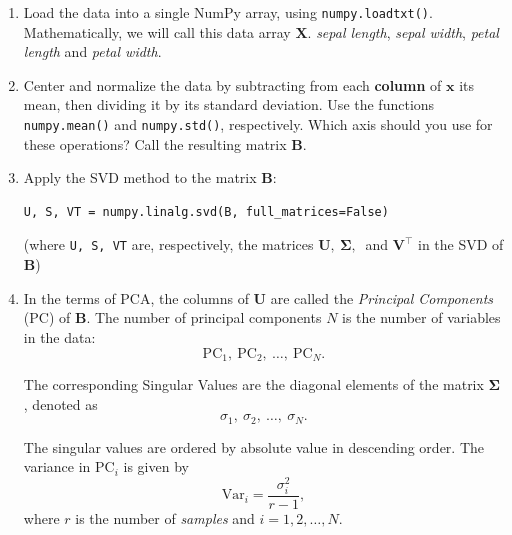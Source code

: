 \documentclass[12pt]{scrartcl}
\newcommand{\pyinl}[1]{\texttt{#1}}
\newcommand{\mtrx}[1]{\mathbf{#1}}
\newcommand{\T}[1]{#1^{\intercal}}
\newcommand{\PC}[1]{\mathrm{PC}_{#1}}
\newcommand{\var}[1]{\mathrm{Var}_{#1}}
\begin{document}
\begin{enumerate}
	\item Load the data into a single NumPy array, using \pyinl{numpy.loadtxt()}. Mathematically, we will call this data array $\mtrx{X}$. \textit{sepal length}, \textit{sepal width}, \textit{petal length} and \textit{petal width}.
	\item Center and normalize the data by subtracting from each \textbf{column} of $\mtrx{x}$ its mean, then dividing it by its standard deviation. Use the functions \pyinl{numpy.mean()} and \pyinl{numpy.std()}, respectively. Which axis should you use for these operations? Call the resulting matrix $\mtrx{B}$.
	\item Apply the SVD method to the matrix $\mtrx{B}$:
	      \begin{verbatim}
U, S, VT = numpy.linalg.svd(B, full_matrices=False)
    \end{verbatim}
	      (where \pyinl{U, S, VT} are, respectively, the matrices $\mtrx{U},\ \mtrx{\Sigma},\ $ and $\T{\mtrx{V}}$ in the SVD of $\mtrx{B}$)
	\item In the terms of PCA, the columns of $\mtrx{U}$ are called the \textit{Principal Components} (PC) of $\mtrx{B}$. The number of principal components $N$ is the number of variables in the data:
	      \[
		      \PC{1},\ \PC{2},\ \dots,\ \PC{N}.
	      \]

	      The corresponding Singular Values are the diagonal elements of the matrix $\mtrx{\Sigma}$, denoted as
	      \[
		      \sigma_{1},\ \sigma_{2},\ \dots,\ \sigma_{N}.
	      \]

	      The singular values are ordered by absolute value in descending order. The variance in $\PC{i}$ is given by
	      \[
		      \var{i} = \frac{\sigma_{i}^{2}}{r-1},
	      \]
	      where $r$ is the number of \textit{samples} and $i=1,2,\dots,N$.


\end{enumerate}
\end{document}
